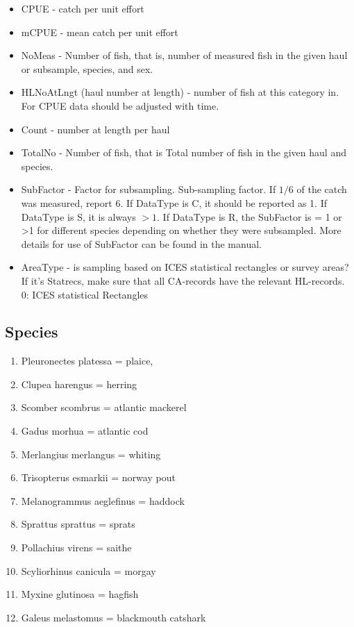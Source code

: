\documentclass[useAMS,referee]{biom}
\numberwithin{equation}{section}
\begin{document}
\begin{itemize}
\item CPUE - catch per unit effort
\item mCPUE - mean catch per unit effort
\item NoMeas -  Number of fish, that is, number of measured fish in the given haul or subsample, species, and sex.\\
\item HLNoAtLngt (haul number at length) - number of fish at this category in. For CPUE data should be adjusted with time. \\
\item Count - number at length per haul \\
\item TotalNo - Number of fish, that is Total number of fish in the given haul and species. \\
\item SubFactor - Factor for subsampling. Sub-sampling factor. If $1/6$ of the catch was measured, report 6.  If DataType is C, it should be reported as 1. If DataType is S,  it is always $>1$. If DataType is R, the SubFactor is = 1 or >1  for different species depending on whether they were subsampled. More details for use of SubFactor can be found in the manual.\\
\item AreaType - is sampling based on ICES statistical rectangles or  survey areas? If it's Statrecs, make sure that all CA-records  have the relevant HL-records. 0: ICES statistical Rectangles
\end{itemize}

\subsection{Species}

\begin{enumerate}

\item Pleuronectes platessa = plaice,        
\item Clupea harengus = herring  
\item Scomber scombrus = atlantic mackerel 
\item  Gadus morhua   = atlantic cod
\item Merlangius merlangus  = whiting       
\item  Trisopterus esmarkii = norway pout
\item Melanogrammus aeglefinus = haddock     
\item Sprattus sprattus = sprats 
\item Pollachius virens = saithe
\item  Scyliorhinus canicula = morgay
\item Myxine glutinosa  = hagfish  
\item  Galeus melastomus =  blackmouth catshark 

\end{enumerate}
\end{document}
